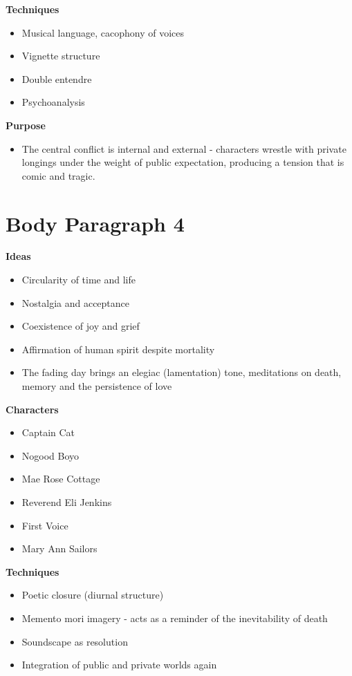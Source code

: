 	\textbf{Techniques}
		
		\begin{itemize}
			\item Musical language, cacophony of voices
			\item Vignette structure
			\item Double entendre
			\item Psychoanalysis
		\end{itemize}

	\textbf{Purpose}

		\begin{itemize}
			\item The central conflict is internal and external - characters wrestle with private longings under the weight of public expectation, producing a tension that is comic and tragic.
		\end{itemize}

\section{Body Paragraph 4}

	\textbf{Ideas}
	\begin{itemize}
		\item Circularity of time and life
		\item Nostalgia and acceptance
		\item Coexistence of joy and grief
		\item Affirmation of human spirit despite mortality
		\item The fading day brings an elegiac (lamentation) tone, meditations on death, memory and the persistence of love
	\end{itemize}

	\textbf{Characters}
	\begin{itemize}
		\item Captain Cat
		\item Nogood Boyo
		\item Mae Rose Cottage
		\item Reverend Eli Jenkins
		\item First Voice
		\item Mary Ann Sailors
	\end{itemize}

	\textbf{Techniques}
	\begin{itemize}
		\item Poetic closure (diurnal structure)
		\item Memento mori imagery - acts as a reminder of the inevitability of death
		\item Soundscape as resolution
		\item Integration of public and private worlds again
	\end{itemize}	

